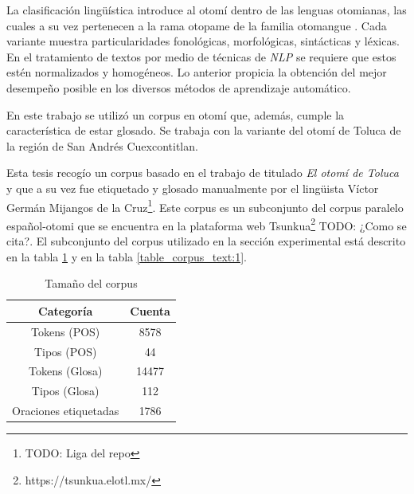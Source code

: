 \documentclass[letterpaper,12pt,oneside]{book}
\begin{document}
	La clasificación lingüística introduce al otomí dentro de las lenguas otomianas, las cuales a su vez pertenecen a la rama otopame de la familia otomangue \citep{barrientos2004otomies}. Cada variante muestra particularidades fonológicas, morfológicas, sintácticas y léxicas. En el tratamiento de textos por medio de técnicas de \textit{NLP} se requiere que estos estén normalizados y homogéneos. Lo anterior propicia la obtención del mejor desempeño posible en los diversos métodos de aprendizaje automático.

	

	En este trabajo se utilizó un corpus en otomí que, además, cumple la característica de estar glosado. Se trabaja con la variante del otomí de Toluca de la región de San Andrés Cuexcontitlan.

	

	Esta tesis recogío un corpus basado en el trabajo de \citet{lastra1992otomi} titulado \emph{El otomí de Toluca} y que a su vez fue  etiquetado y glosado manualmente por el lingüista Víctor Germán Mijangos de la Cruz\footnote{TODO: Liga del repo}. Este corpus es un subconjunto del corpus paralelo español-otomi que se encuentra en la plataforma web Tsunkua\footnote{https://tsunkua.elotl.mx/} TODO: ¿Como se cita?. El subconjunto del corpus utilizado en la sección experimental está descrito en la tabla \ref{table_corpus_length:1} y en la tabla \ref{table_corpus_text:1}. 

	


	

	\begin{table}

		\centering

		\begin{tabular}{c | c}

			\textbf{Categoría} & \textbf{Cuenta} \\ \hline

			Tokens (POS) & 8578\\

			Tipos (POS) & 44\\

			Tokens (Glosa) & 14477\\

			Tipos (Glosa) & 112\\

			Oraciones etiquetadas & 1786 \\ 

		\end{tabular}

		\caption{Tamaño del corpus}

		\label{table_corpus_length:1}

	\end{table}
\end{document}
